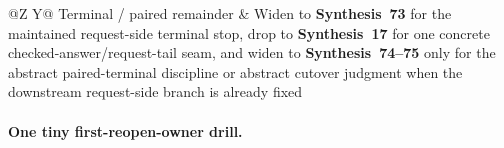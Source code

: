 \documentclass[11pt]{article}
\begin{document}
\begin{table}[t]
\begin{tabularx}{\linewidth}{@{}Z Y@{}}
Terminal / paired remainder & Widen to \textbf{Synthesis~73} for the maintained request-side terminal stop, drop to \textbf{Synthesis~17} for one concrete checked-answer/request-tail seam, and widen to \textbf{Synthesis~74--75} only for the abstract paired-terminal discipline or abstract cutover judgment when the downstream request-side branch is already fixed \\
\bottomrule
\end{tabularx}
\caption{A compact first-reopen-owner card. This is the smallest local map from one stale public-request-response-packet shortcut to the first narrower or wider owner that regains authority.}
\label{tab:first-reopen-owner-card-public-request-response-packets}
\end{table}

\paragraph{One tiny first-reopen-owner drill.}
\end{document}
